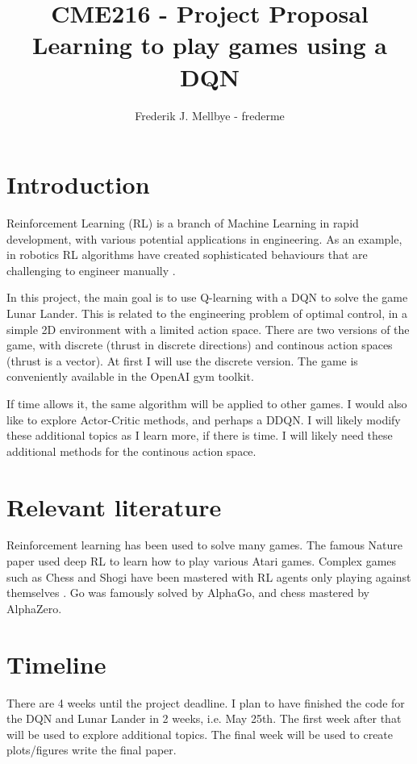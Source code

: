 \documentclass[letterpaper, 11pt]{article}
\title{\vspace{-1.5cm}CME216 - Project Proposal \\ Learning to play games using a DQN}
\author{Frederik J. Mellbye - frederme}
\date{}
\begin{document}
\maketitle


\section{Introduction}
Reinforcement Learning (RL) is a branch of Machine Learning in rapid development, with various potential applications in engineering. As an example, in robotics RL algorithms have created sophisticated behaviours that are challenging to engineer manually \cite{robotics}.

In this project, the main goal is to use Q-learning with a DQN to solve the game Lunar Lander. This is related to the engineering problem of optimal control, in a simple 2D environment with a limited action space. There are two versions of the game, with discrete (thrust in discrete directions) and continous action spaces (thrust is a vector). At first I will use the discrete version. The game is conveniently available in the OpenAI gym toolkit.

If time allows it, the same algorithm will be applied to other games. I would also like to explore Actor-Critic methods, and perhaps a DDQN. I will likely modify these additional topics as I learn more, if there is time. I will likely need these additional methods for the continous action space.

\section{Relevant literature}
Reinforcement learning has been used to solve many games. The famous Nature paper \cite{mnih2015humanlevel} used deep RL to learn how to play various Atari games. Complex games such as Chess and Shogi have been mastered with RL agents only playing against themselves \cite{chess}. Go was famously solved by AlphaGo, and chess mastered by AlphaZero.

\section{Timeline}

There are 4 weeks until the project deadline. I plan to have finished the code for the DQN and Lunar Lander in 2 weeks, i.e. May 25th. The first week after that will be used to explore additional topics. The final week will be used to create plots/figures write the final paper.

{}

\end{document}
